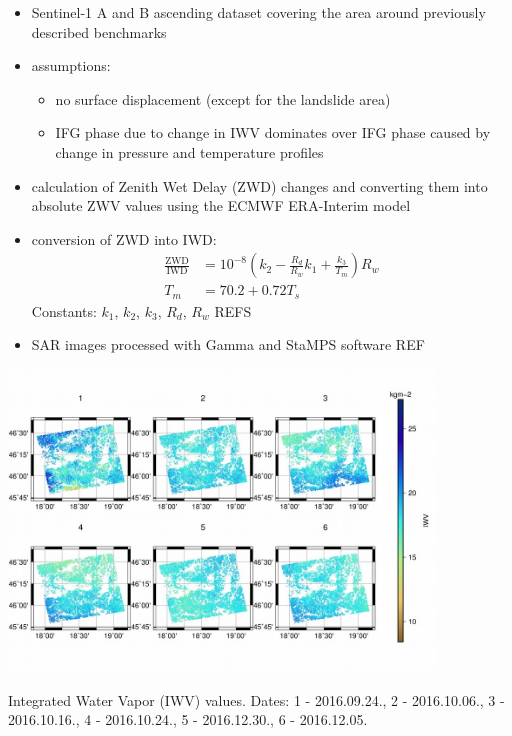 \documentclass{beamer}
\begin{document}
\begin{frame}{\ft}
    \begin{itemize}
        \item Sentinel-1 A and B ascending dataset covering the area around previously described benchmarks
        \item assumptions:
        \begin{itemize}
            \item no surface displacement (except for the landslide area)
            \item IFG phase due to change in IWV dominates over IFG phase caused by change in pressure and temperature profiles
        \end{itemize}
        \item calculation of Zenith Wet Delay (ZWD) changes and converting them into absolute ZWV values using the ECMWF ERA-Interim model
        \item conversion of ZWD into IWD:
        \begin{align*}
            \frac{\mathrm{ZWD}}{\mathrm{IWD}} &= 10^{-8} \left(k_2 - \frac{R_d}{R_w} k_1 + \frac{k_3}{T_m} \right) R_w \\
            T_m &= 70.2 + 0.72 T_s
        \end{align*}
        Constants: $k_1$, $k_2$, $k_3$, $R_d$, $R_w$ REFS
        \item SAR images processed with Gamma and StaMPS software REF
    \end{itemize}    
\end{frame}


\begin{frame}{\ft}
    \begin{center}
        \includegraphics[width=0.85\textwidth]{iwv.png}
        \vspace{-20pt}
        
        {\small Integrated Water Vapor (IWV) values. Dates:  1 - 2016.09.24., 2 - 2016.10.06., 3 - 2016.10.16., 4 - 2016.10.24., 5 - 2016.12.30., 6 - 2016.12.05.}
    \end{center}
\end{frame}
\end{document}
